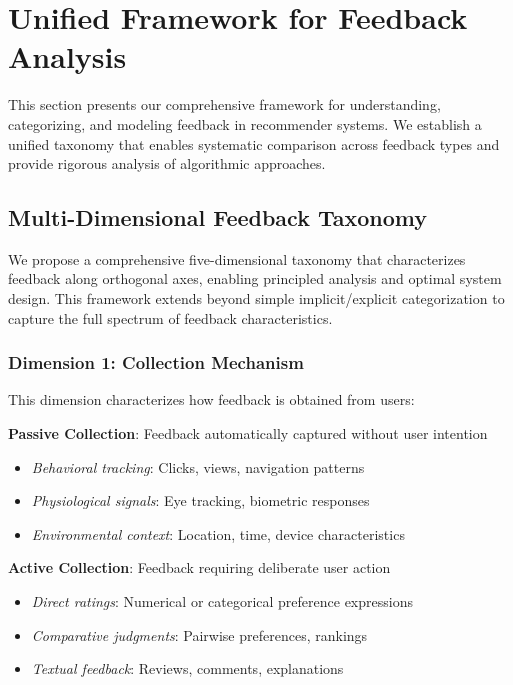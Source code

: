 
\section{Unified Framework for Feedback Analysis}
\label{sec:methodology}

This section presents our comprehensive framework for understanding, categorizing, and modeling feedback in recommender systems. We establish a unified taxonomy that enables systematic comparison across feedback types and provide rigorous analysis of algorithmic approaches.

\subsection{Multi-Dimensional Feedback Taxonomy}
\label{subsec:taxonomy}

We propose a comprehensive five-dimensional taxonomy that characterizes feedback along orthogonal axes, enabling principled analysis and optimal system design. This framework extends beyond simple implicit/explicit categorization to capture the full spectrum of feedback characteristics.

\subsubsection{Dimension 1: Collection Mechanism}
This dimension characterizes how feedback is obtained from users:

\textbf{Passive Collection}: Feedback automatically captured without user intention
\begin{itemize}
    \item \textit{Behavioral tracking}: Clicks, views, navigation patterns
    \item \textit{Physiological signals}: Eye tracking, biometric responses
    \item \textit{Environmental context}: Location, time, device characteristics
\end{itemize}

\textbf{Active Collection}: Feedback requiring deliberate user action
\begin{itemize}
    \item \textit{Direct ratings}: Numerical or categorical preference expressions
    \item \textit{Comparative judgments}: Pairwise preferences, rankings
    \item \textit{Textual feedback}: Reviews, comments, explanations
\end{itemize}

